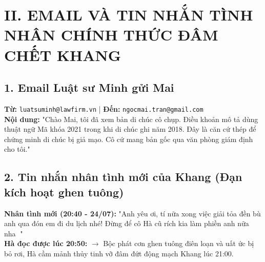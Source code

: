 \documentclass[12pt,a4paper]{article}
\begin{document}
\section*{II. EMAIL VÀ TIN NHẮN TÌNH NHÂN CHÍNH THỨC ĐÂM CHẾT KHANG}

\subsection*{1. Email Luật sư Minh gửi Mai}
\begin{tcolorbox}[colback=blue!5!white,colframe=blue!75!black,title=\textbf{EMAIL TƯ VẤN PHÁP LÝ DI CHÚC}]
\textbf{Từ:} \texttt{luatsuminh@lawfirm.vn} | \textbf{Đến:} \texttt{ngocmai.tran@gmail.com}\\
\textbf{Nội dung:} "Chào Mai, tôi đã xem bản di chúc cô chụp. Điều khoản mô tả dùng thuật ngữ Mã khóa 2021 trong khi di chúc ghi năm 2018. Đây là căn cứ thép để chứng minh di chúc bị giả mạo. Cô cứ mang bản gốc qua văn phòng giám định cho tôi."
\end{tcolorbox}

\subsection*{2. Tin nhắn nhân tình mới của Khang (Đạn kích hoạt ghen tuông)}
\begin{tcolorbox}[colback=red!5!white,colframe=red!75!black,title=\textbf{TIN NHẮN TRÊN MÀN HÌNH ĐIỆN THOẠI KHANG}]
\textbf{Nhân tình mới (20:40 - 24/07):} "Anh yêu ơi, tí nữa xong việc giải tỏa đền bù anh qua đón em đi du lịch nhé! Đừng để cô Hà cũ rích kia làm phiền anh nữa nha 💋"\\
\textbf{Hà đọc được lúc 20:50:} $\rightarrow$ Bộc phát cơn ghen tuông điên loạn và uất ức bị bỏ rơi, Hà cầm mảnh thủy tinh vỡ đâm đứt động mạch Khang lúc 21:00.
\end{tcolorbox}
\end{document}
